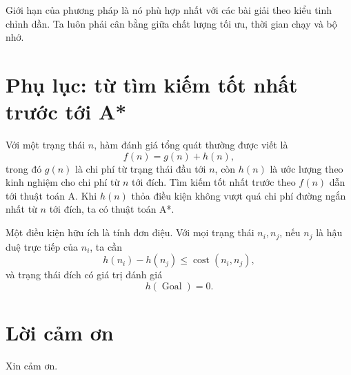 \documentclass[11pt]{article}
\newcommand{\cost}{\operatorname{cost}}
\newcommand{\Goal}{\operatorname{Goal}}
\begin{document}
Giới hạn của phương pháp là nó phù hợp nhất với các bài giải theo kiểu tinh
chỉnh dần. Ta luôn phải cân bằng giữa chất lượng tối ưu, thời gian chạy và bộ
nhớ.

\section*{Phụ lục: từ tìm kiếm tốt nhất trước tới A*}

Với một trạng thái \(n\), hàm đánh giá tổng quát thường được viết là
\[
  f(n)=g(n)+h(n),
\]
trong đó \(g(n)\) là chi phí từ trạng thái đầu tới \(n\), còn \(h(n)\) là ước
lượng theo kinh nghiệm cho chi phí từ \(n\) tới đích. Tìm kiếm tốt nhất trước
theo \(f(n)\) dẫn tới thuật toán A. Khi \(h(n)\) thỏa điều kiện không vượt quá
chi phí đường ngắn nhất từ \(n\) tới đích, ta có thuật toán A*.

Một điều kiện hữu ích là tính đơn điệu. Với mọi trạng thái \(n_i,n_j\), nếu
\(n_j\) là hậu duệ trực tiếp của \(n_i\), ta cần
\[
  h(n_i)-h(n_j)\le \cost(n_i,n_j),
\]
và trạng thái đích có giá trị đánh giá
\[
  h(\Goal)=0.
\]

\section*{Lời cảm ơn}

Xin cảm ơn.
\end{document}
